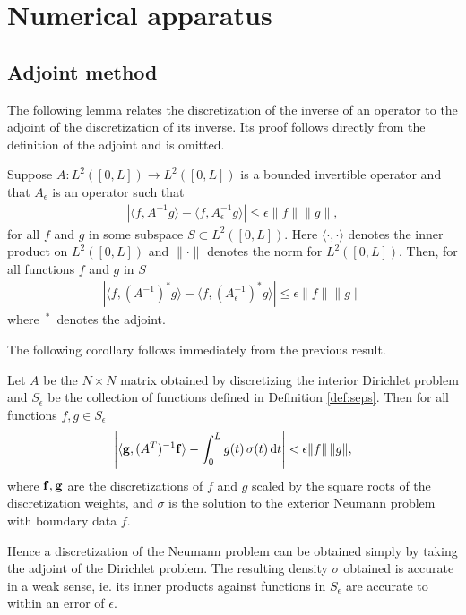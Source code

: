 
\section{Numerical apparatus}
\subsection{Adjoint method}

The following lemma relates the discretization of the inverse of an operator to the adjoint of the discretization of its inverse. Its proof follows directly from the definition of the adjoint and is omitted.
\begin{lemma}\label{lem_adjm}
Suppose $A: L^2([0,L]) \to L^2([0,L])$ is a bounded invertible operator and that $A_\epsilon$ is an operator such that
\begin{align}
\left| \langle f,A^{-1} g \rangle - \langle f,A^{-1}_\epsilon g \rangle \right| \le \epsilon \|f\| \|g\|,
\end{align}
for all $f$ and $g$ in some subspace $S \subset L^2([0,L]).$ Here $\langle \cdot, \cdot \rangle$ denotes the inner product on $L^2([0,L])$ and $\| \cdot\|$ denotes the norm for $L^2([0,L]).$ Then, for all functions $f$ and $g$ in $S$
\begin{align}
\left| \langle f,(A^{-1})^* g \rangle - \langle f,\left(A^{-1}_\epsilon\right)^* g \rangle \right| \le \epsilon \|f\| \|g\|
\end{align}
where $\,{{}^*}\,$ denotes the adjoint.
\end{lemma}

The following corollary follows immediately from the previous result.
\begin{corollary}
Let $A$ be the $N\times N$ matrix obtained by discretizing the interior Dirichlet problem and $S_\epsilon$ be the collection of functions defined in Definition \ref{def:seps}. Then for all functions $f,g \in S_\epsilon$
\begin{align}
\left| \langle {\bf g}, (A^T)^{-1}{\bf f} \rangle - \int_0^L g(t)\,\sigma(t)\,{\rm d}t \right| < \epsilon \|f\|\, \|g\|,
\end{align}
where ${\bf f},{\bf g}$ are the discretizations of $f$ and $g$ scaled by the square roots of the discretization weights, and $\sigma$ is the solution to the exterior Neumann problem with boundary data $f$.
\end{corollary}

Hence a discretization of the Neumann problem can be obtained simply by taking the adjoint of the Dirichlet problem. The resulting density $\sigma$ obtained is accurate in a weak sense, ie. its inner products against functions in $S_\epsilon$ are accurate to within an error of $\epsilon.$

